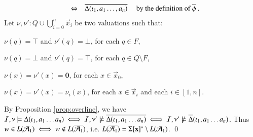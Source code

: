 \documentclass{llncs}
\begin{document}
{\[\begin{array}{rcll}
  & \Leftrightarrow & \overline{\Delta(\iota_1,a_1\ldots,a_n)} & \text{ by the definition of $\overline{\phi}$ .}
  \end{array}\]
  Let $\nu,\nu' : Q \cup \bigcup_{i=0}^n\vec{x}_i$ be two valuations
  such that: \begin{compactitem}
  \item $\nu(q) = \top$ and $\nu'(q) = \bot$, for each $q \in F$, 
  \item $\nu(q) = \bot$ and $\nu'(q) = \top$, for each $q \in Q \setminus F$, 
  \item $\nu(x) = \nu'(x) = \mathbf{0}$, for each $x \in \vec{x}_0$, 
  \item $\nu(x) = \nu'(x) = \nu_i(x)$, for each $x \in \vec{x}_i$ and each $i
    \in [1,n]$.
  \end{compactitem}
  By Proposition \ref{prop:overline}, we have $\mathcal{I},\nu \models
  \Delta(\iota_1,a_1 \ldots a_n) \iff \mathcal{I},\nu' \not\models
  \overline{\Delta(\iota_1,a_1 \ldots a_n)} \iff \mathcal{I},\nu' \not\models
  \overline{\Delta}(\iota_1,a_1 \ldots a_n)$. Thus $w \in L(\mathcal{A}_1) \iff
  w \not\in L(\overline{\mathcal{A}_1})$, i.e. $L(\overline{\mathcal{A}_1}) =
  \Sigma[\mathbf x]^* \setminus L(\mathcal{A}_1)$. \qed}

\end{document}
